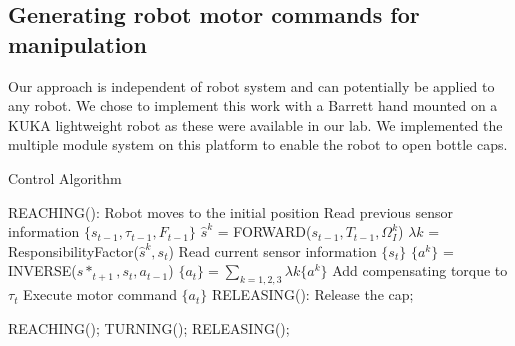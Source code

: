 

\subsection{Generating robot motor commands for manipulation}
\label{sec:command}
Our approach is independent of robot system and can potentially be
applied to any robot. We chose to implement this work with a Barrett
hand mounted on a KUKA lightweight robot as these were available in
our lab. We implemented the multiple module system on this platform to
enable the robot to open bottle caps.

\begin{algorithm}
  \caption{Control Algorithm}
  \begin{algorithmic}[1]
    \State REACHING(): Robot moves to the initial position\;
          \State Read previous sensor information $\{s_{t-1},\tau_{t-1},F_{t-1}\}$\;
            \State $\hat{s}^{k}$ = FORWARD($s_{t-1},T_{t-1},\Omega_I^k$) \;
          \EndFor
            \State $\lambda{k}$ = ResponsibilityFactor($\hat{s}^{k},s_t$) \;
          \EndFor
          \State Read current sensor information $\{s_{t}\}$\;
            \State $\{a^k\}$ = INVERSE($s*_{t+1},s_t,a_{t-1}$) \;
          \EndFor
          \State $\{a_t\} = \sum_{k=1,2,3}\lambda{k}\{a^k\}$\;\;
          \State Add compensating torque to $\tau_t$\;
          \State Execute motor command $\{a_t\}$ \;
          \State RELEASING(): Release the cap;
        \EndFunction
    \EndFor

        \State REACHING();
        \State TURNING();
        \State RELEASING();
    \EndWhile

  \end{algorithmic}
  \label{code:control}
\end{algorithm}


